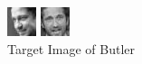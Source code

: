 \documentclass[12pt]{article} %
\begin{document}
\begin{figure}[H] %
  \centering 
  \begin{minipage}[b]{0.2\textwidth}
    \includegraphics[width=\textwidth]{part3_3_4_correct_butler}
    \caption{Target Image of Butler}
  \end{minipage}
  \begin{minipage}[b]{0.1\textwidth}
    \includegraphics[width=\textwidth]{part3_3_4_error1_butler}

\end{minipage}
\end{figure}
\end{document}
